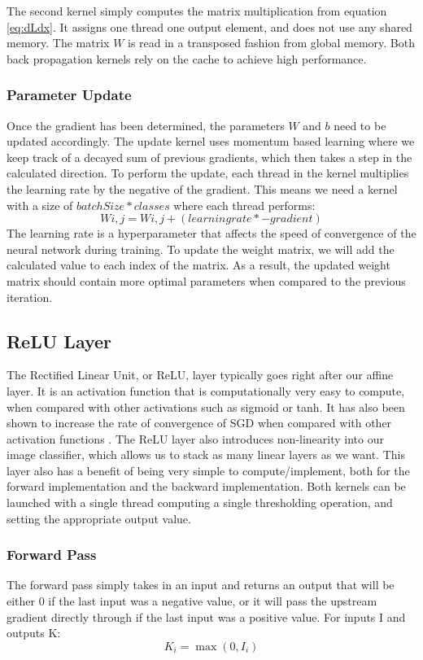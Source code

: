 \documentclass[conference]{IEEEtran}
\begin{document}
The second kernel simply computes the matrix multiplication from equation \ref{eq:dLdx}. It assigns one thread one output element, and does not use any shared memory. The matrix $W$ is read in a transposed fashion from global memory. Both back propagation kernels rely on the cache to achieve high performance.

\subsubsection{Parameter Update}
Once the gradient has been determined, the parameters $W$ and $b$ need to be updated accordingly. The update kernel uses momentum based learning where we keep track of a decayed sum of previous gradients, which then takes a step in the calculated direction. To perform the update, each thread in the kernel multiplies the learning rate by the negative of the gradient. This means we need a kernel with a size of $batchSize * classes$ where each thread performs: $$W{i,j} = W{i,j} + (learning rate * -gradient)$$ The learning rate is a hyperparameter that affects the speed of convergence of the neural network during training. To update the weight matrix, we will add the calculated value to each index of the matrix. As a result, the updated weight matrix should contain more optimal parameters when compared to the previous iteration.

\subsection{ReLU Layer}
The Rectified Linear Unit, or ReLU, layer typically goes right after our affine layer. It is an activation function that is computationally very easy to compute, when compared with other activations such as sigmoid or tanh. It has also been shown to increase the rate of convergence of SGD when compared with other activation functions \cite{b6}. The ReLU layer also introduces non-linearity into our image classifier, which allows us to stack as many linear layers as we want. This layer also has a benefit of being very simple to compute/implement, both for the forward implementation and the backward implementation. Both kernels can be launched with a single thread computing a single thresholding operation, and setting the appropriate output value.

\subsubsection{Forward Pass}
The forward pass simply takes in an input and returns an output that will be either 0 if the last input was a negative value, or it will pass the upstream gradient directly through if the last input was a positive value. For inputs I and outputs K: 
\begin{equation} \label{eq:reluForward}
    K_i = \max( 0, I_i )
\end{equation}
\end{document}
